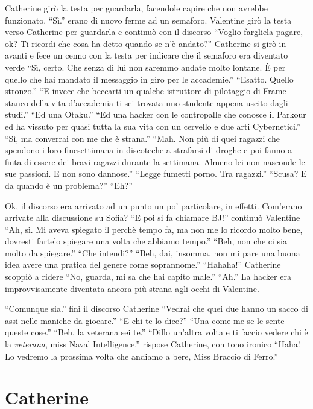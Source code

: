     Catherine girò la testa per guardarla, facendole capire che non avrebbe funzionato. ``Sì.'' erano di nuovo ferme ad
    un semaforo. Valentine girò la testa verso Catherine per guardarla e continuò con il discorso ``Voglio fargliela
    pagare, ok? Ti ricordi che cosa ha detto quando se n'è andato?'' Catherine si girò in avanti e fece un cenno con la
    testa per indicare che il semaforo era diventato verde ``Sì, certo. Che senza di lui non saremmo andate molto
    lontane. È per quello che hai mandato il messaggio in giro per le accademie.'' ``Esatto. Quello stronzo.'' ``E
    invece che beccarti un qualche istruttore di pilotaggio di Frame stanco della vita d'accademia ti sei trovata uno
    studente appena uscito dagli studi.'' ``Ed una Otaku.'' ``Ed una hacker con le contropalle che conosce il Parkour ed
    ha vissuto per quasi tutta la sua vita con un cervello e due arti Cybernetici.'' ``Sì, ma converrai con me che è
    strana.'' ``Mah. Non più di quei ragazzi che spendono i loro finesettimana in discoteche a strafarsi di droghe e poi
    fanno a finta di essere dei bravi ragazzi durante la settimana. Almeno lei non nasconde le sue passioni. E non sono
    dannose.'' ``Legge fumetti porno. Tra ragazzi.'' ``Scusa? E da quando è un problema?'' ``Eh?''

    Ok, il discorso era arrivato ad un punto un po' particolare, in effetti. Com'erano arrivate alla discussione su
    Sofia? ``E poi si fa chiamare BJ!'' continuò Valentine ``Ah, sì. Mi aveva spiegato il perchè tempo fa, ma non me lo
    ricordo molto bene, dovresti fartelo spiegare una volta che abbiamo tempo.'' ``Beh, non che ci sia molto da
    spiegare.'' ``Che intendi?'' ``Beh, dai, insomma, non mi pare una buona idea avere una pratica del genere come
    soprannome.'' ``Hahaha!'' Catherine scoppiò a ridere ``No, guarda, mi sa che hai capito male.'' ``Ah.'' La hacker
    era improvvisamente diventata ancora più strana agli occhi di Valentine.

    ``Comunque sia.'' finì il discorso Catherine ``Vedrai che quei due hanno un sacco di assi nelle maniche da
    giocare.'' ``E chi te lo dice?'' ``Una come me se le sente queste cose.'' ``Beh, la veterana sei te.'' ``Dillo
    un'altra volta e ti faccio vedere chi è la \emph{veterana}, miss Naval Intelligence.'' rispose Catherine, con tono
    ironico ``Haha! Lo vedremo la prossima volta che andiamo a bere, Miss Braccio di Ferro.''

  \section*{Catherine}

